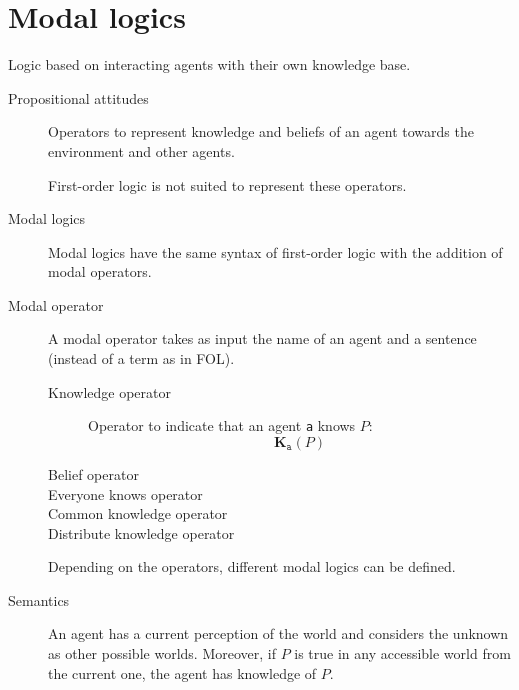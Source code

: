 


\section{Modal logics}

Logic based on interacting agents with their own knowledge base.

\begin{description}
    \item[Propositional attitudes] 
        Operators to represent knowledge and beliefs of an agent towards the environment and other agents.

        First-order logic is not suited to represent these operators.

    \item[Modal logics] 
        Modal logics have the same syntax of first-order logic with the addition of modal operators.

    \item[Modal operator]
        A modal operator takes as input the name of an agent and a sentence (instead of a term as in FOL).
        
        \begin{description}
            \item[Knowledge operator] 
                Operator to indicate that an agent \texttt{a} knows $P$:
                \[ \textbf{K}_\texttt{a}(P) \]

            \item[Belief operator]
            \item[Everyone knows operator]
            \item[Common knowledge operator]
            \item[Distribute knowledge operator]
        \end{description}

        Depending on the operators, different modal logics can be defined.

    \item[Semantics]
        An agent has a current perception of the world and considers the unknown as other possible worlds.
        Moreover, if $P$ is true in any accessible world from the current one, the agent has knowledge of $P$.


\end{description}
